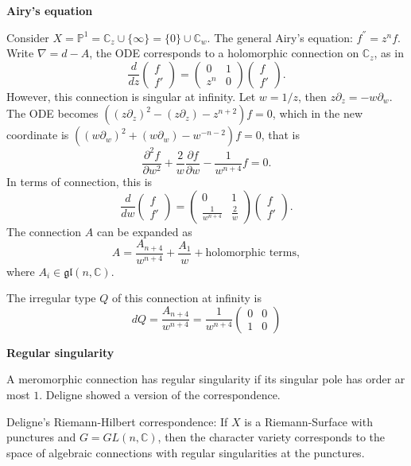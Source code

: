 \documentclass[oneside,english]{amsbook}
\numberwithin{section}{chapter}
\numberwithin{equation}{section}
\numberwithin{figure}{section}
\theoremstyle{plain}
\theoremstyle{definition}
\theoremstyle{remark}
\theoremstyle{definition}
\theoremstyle{definition}
\theoremstyle{plain}
\begin{document}
\medskip
\textbf{Airy's equation}

Consider $X = \mathbb{P}^1 = \mathbb{C}_z \cup \{\infty\} = \{0\}\cup \mathbb{C}_w$. The general Airy's equation: $f^{''} = z^n f$. Write $\nabla = d - A$, the ODE corresponds to a holomorphic connection on $\mathbb{C}_z$, as in
$$\frac{d}{dz}\begin{pmatrix}
      f \\
      f'
    \end{pmatrix}
  = \begin{pmatrix}
  0 & 1 \\ z^n & 0
  \end{pmatrix}\begin{pmatrix}
      f \\
      f'
    \end{pmatrix}.$$
However, this connection is singular at infinity. Let $w =1/z$, then $z\partial_z = - w\partial_w$. The ODE becomes $((z\partial_z)^2 - (z\partial_z) - z^{n+2})f = 0$, which in the new coordinate is $((w\partial_w)^2 + (w\partial_w) - w^{-n-2})f = 0$, that is
$$\frac{\partial^2f}{\partial w^2} + \frac{2}{w}\frac{\partial f}{\partial w} - \frac{1}{w^{n+4}}f =0.$$
In terms of connection, this is
$$\frac{d}{dw}\begin{pmatrix}
      f \\
      f'
    \end{pmatrix}
  = \begin{pmatrix}
  0 & 1 \\ \frac{1}{w^{n+4}} & \frac{2}{w}
  \end{pmatrix}\begin{pmatrix}
      f \\
      f'
    \end{pmatrix}.$$
The connection $A$ can be expanded as
$$A = \frac{A_{n+4}}{w^{n+4}} + \frac{A_1}{w} + \text{holomorphic terms},$$
where $A_i \in \mathfrak{gl}(n,\mathbb{C})$.

The irregular type $Q$ of this connection at infinity is
$$dQ = \frac{A_{n+4}}{w^{n+4}} = \frac{1}{w^{n+4}}\begin{pmatrix} 0 & 0 \\ 1 & 0\end{pmatrix}$$

\medskip
\textbf{Regular singularity}

A meromorphic connection has regular singularity if its singular pole has order ar most $1$. Deligne showed a version of the correspondence.

Deligne's Riemann-Hilbert correspondence: If $X$ is a Riemann-Surface with punctures and $G =GL(n,\mathbb{C})$, then the character variety corresponds to the space of algebraic connections with regular singularities at the punctures.
\end{document}
